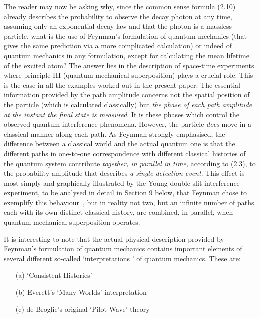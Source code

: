 \documentclass [12pt]{article}
\begin{document}
{    \par The reader may now be asking why, since the common sense formula (2.10) already
    describes the probability to observe the decay photon at any time, assuming only an
    exponential decay law and that the photon is a massless particle, what is the use of
    Feynman's formulation of quantum mechanics (that gives the same prediction via 
    a more complicated calculation) or indeed of 
    quantum mechanics in any formulation, except for calculating the mean lifetime of the 
    excited atom? The answer lies in the description of space-time experiments where
    principle III (quantum mechanical superposition) plays a crucial role. This is  the 
    case in all the examples worked out in the present paper. The essential information
    provided by the path amplitude concerns not the spatial position of the particle
    (which is calculated classically) but {\it the phase of each path amplitude
    at the instant the final state is measured}. It is these phases which control
    the observed quantum interference phenomena. However, the particle {\it does} move in a classical
    manner along each path. As Feynman strongly emphasised, the difference
    between a classical world and the actual quantum one is that the different paths
    in one-to-one correspondence with different classical histories of the quantum 
    system contribute {\it together, in parallel in time,} according to (2.3), to the
    probability amplitude that describes {\it a single detection  event}. This effect is most
    simply and graphically illustrated by the Young double-slit interference
    experiment, to be analysed in detail in Section 9 below, that Feynman chose to
     exemplify this behaviour~\cite{Feyn7}, but in reality
    not two, but an infinite number of paths each with its own distinct classical
    history, are combined, in parallel, when quantum mechanical superposition operates.
    \par It is interesting to note that the actual physical description provided by Feynman's
    formulation of quantum mechanics contains important elements of several different so-called
   `interpretations ' of quantum mechanics. These are:
    \begin{itemize}
   \item[(a)] `Consistent Histories'
   \item[(b)] Everett's `Many Worlds' interpretation
   \item[(c)] de Broglie's original `Pilot Wave' theory
   \end{itemize}
}
\end{document}
